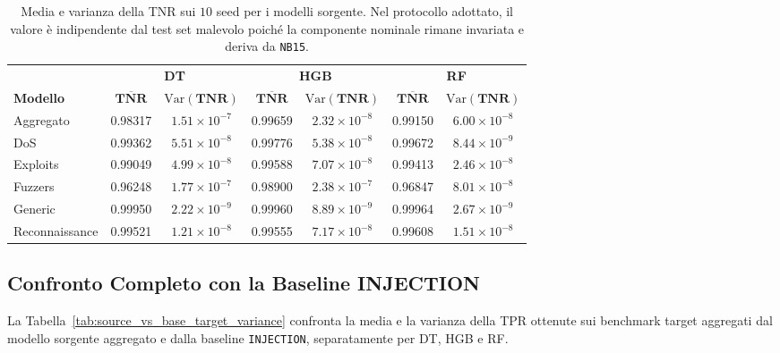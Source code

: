 \begin{table}[H]
    \centering
    \footnotesize
    \caption{Media e varianza della TNR sui $10$ seed per i modelli sorgente. Nel protocollo adottato, il valore è indipendente dal test set malevolo poiché la componente nominale rimane invariata e deriva da \texttt{NB15}.}
    \label{tab:sorgente_tnr_multiseed}
    \begin{tabular}{lcccccc}
        \toprule
        & \multicolumn{2}{c}{\textbf{DT}} & \multicolumn{2}{c}{\textbf{HGB}} & \multicolumn{2}{c}{\textbf{RF}} \\
        \textbf{Modello} & $\boldsymbol{\overline{TNR}}$ & $\boldsymbol{\mathrm{Var}(TNR)}$ & $\boldsymbol{\overline{TNR}}$ & $\boldsymbol{\mathrm{Var}(TNR)}$ & $\boldsymbol{\overline{TNR}}$ & $\boldsymbol{\mathrm{Var}(TNR)}$ \\
        \midrule
        Aggregato & 0.98317 & $1.51\times10^{-7}$ & 0.99659 & $2.32\times10^{-8}$ & 0.99150 & $6.00\times10^{-8}$ \\
        DoS & 0.99362 & $5.51\times10^{-8}$ & 0.99776 & $5.38\times10^{-8}$ & 0.99672 & $8.44\times10^{-9}$ \\
        Exploits & 0.99049 & $4.99\times10^{-8}$ & 0.99588 & $7.07\times10^{-8}$ & 0.99413 & $2.46\times10^{-8}$ \\
        Fuzzers & 0.96248 & $1.77\times10^{-7}$ & 0.98900 & $2.38\times10^{-7}$ & 0.96847 & $8.01\times10^{-8}$ \\
        Generic & 0.99950 & $2.22\times10^{-9}$ & 0.99960 & $8.89\times10^{-9}$ & 0.99964 & $2.67\times10^{-9}$ \\
        Reconnaissance & 0.99521 & $1.21\times10^{-8}$ & 0.99555 & $7.17\times10^{-8}$ & 0.99608 & $1.51\times10^{-8}$ \\
        \bottomrule
    \end{tabular}
\end{table}


\subsection{Confronto Completo con la Baseline INJECTION}

La Tabella~\ref{tab:source_vs_base_target_variance} confronta la media e la varianza della TPR ottenute sui benchmark target aggregati dal modello sorgente aggregato e dalla baseline \texttt{INJECTION}, separatamente per DT, HGB e RF.

